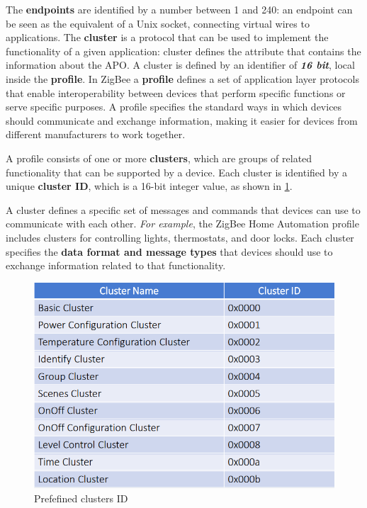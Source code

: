 \documentclass[10pt,a4paper]{report}
\theoremstyle{definition}
\begin{document}
The \textbf{endpoints} are identified by a number between 1 and 240: an endpoint can be seen as the equivalent of a Unix socket, connecting virtual wires to applications.
The \textbf{cluster} is a protocol that can be used to implement the functionality of a given application: cluster defines the attribute that contains the information about the APO. A cluster is defined by an identifier of \textit{\textbf{16 bit}}, local inside the \textbf{profile}. In ZigBee a \textbf{profile} defines a set of application layer protocols that enable interoperability between devices that perform specific functions or serve specific purposes. A profile specifies the standard ways in which devices should communicate and exchange information, making it easier for devices from different manufacturers to work together.

A profile consists of one or more \textbf{clusters}, which are groups of related functionality that can be supported by a device. Each cluster is identified by a unique \textbf{cluster ID}, which is a 16-bit integer value, as shown in \ref{cluster-table}.

A cluster defines a specific set of messages and commands that devices can use to communicate with each other. \textit{For example}, the ZigBee Home Automation profile includes clusters for controlling lights, thermostats, and door locks. Each cluster specifies the \textbf{data format and message types} that devices should use to exchange information related to that functionality.
\begin{figure}[h]
	\centering
	\includegraphics[scale=0.50]{images/Pasted image 20230311124737.png}
	\caption{Prefefined clusters ID}
	\label{cluster-table}
\end{figure}
\end{document}
